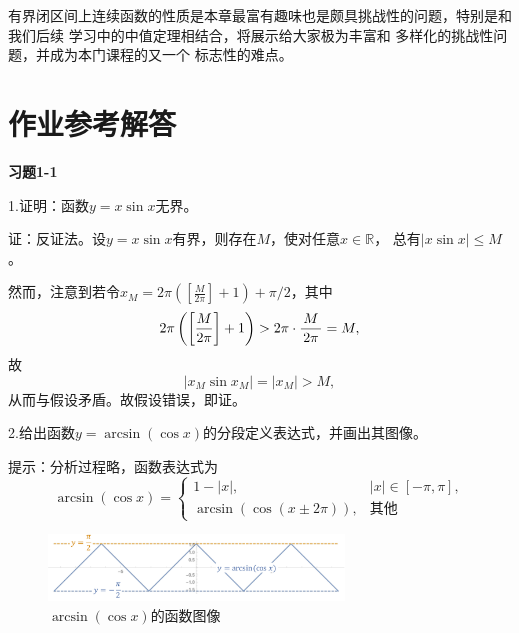 {\kaishu 有界闭区间上连续函数的性质}是本章最富有趣味也是颇具挑战性的问题，特别是和我们后续
学习中的中值定理相结合，将展示给大家极为丰富和
多样化的挑战性问题，并成为本门课程的又一个
标志性的难点。

\newpage

\ifanswer

\newpage
\section*{作业参考解答}

\begin{center}
	\bf 习题1-1
\end{center}

1.证明：函数$y=x\sin x$无界。

证：反证法。设$y=x\sin x$有界，则存在$M$，使对任意$x\in\mathbb{R}$，
总有$|x\sin x|\leq M$。

然而，注意到若令$x_M=2\pi\left(\left[\frac{M}{2\pi}\right]+1\right)
+\pi/2$，其中
$$2\pi\left(\left[\frac{M}{2\pi}\right]+1\right)
>2\pi\cdot\displaystyle\frac{\,{M}\,}{\,{2\pi}\,}=M,$$
故
$$|x_M\sin x_M|=|x_M|>M,$$
从而与假设矛盾。故假设错误，即证。
\fin

\bs
2.给出函数$y=\arcsin(\cos x)$的分段定义表达式，并画出其图像。

提示：分析过程略，函数表达式为
$$\arcsin(\cos x)=\left\{\begin{array}{ll}
1-|x|,& |x|\in[-\pi,\pi],\\
\arcsin(\cos(x\pm2\pi)),& \mbox{其他}
\end{array}\right.$$

\begin{figure}[h]
	\centering
	\includegraphics[width=0.7\textwidth]{./Images/Ch01/arcsin-cos.pdf}
	\caption{$\arcsin(\cos x)$的函数图像}
	\label{fig:arcsin-cos}
\end{figure}
\fin

